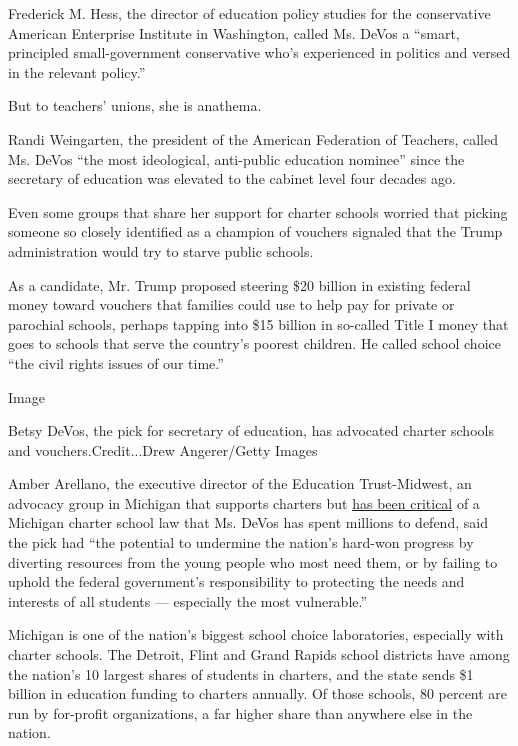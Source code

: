 Frederick M. Hess, the director of education policy studies for the
conservative American Enterprise Institute in Washington, called Ms.
DeVos a ``smart, principled small-government conservative who's
experienced in politics and versed in the relevant policy.''

But to teachers' unions, she is anathema.

Randi Weingarten, the president of the American Federation of Teachers,
called Ms. DeVos ``the most ideological, anti-public education nominee''
since the secretary of education was elevated to the cabinet level four
decades ago.

Even some groups that share her support for charter schools worried that
picking someone so closely identified as a champion of vouchers signaled
that the Trump administration would try to starve public schools.

As a candidate, Mr. Trump proposed steering \$20 billion in existing
federal money toward vouchers that families could use to help pay for
private or parochial schools, perhaps tapping into \$15 billion in
so-called Title I money that goes to schools that serve the country's
poorest children. He called school choice ``the civil rights issues of
our time.''

Image

Betsy DeVos, the pick for secretary of education, has advocated charter
schools and vouchers.Credit...Drew Angerer/Getty Images

Amber Arellano, the executive director of the Education Trust-Midwest,
an advocacy group in Michigan that supports charters but
\href{https://midwest.edtrust.org/accountability-for-all/}{has been
critical} of a Michigan charter school law that Ms. DeVos has spent
millions to defend, said the pick had ``the potential to undermine the
nation's hard-won progress by diverting resources from the young people
who most need them, or by failing to uphold the federal government's
responsibility to protecting the needs and interests of all students ---
especially the most vulnerable.''

Michigan is one of the nation's biggest school choice laboratories,
especially with charter schools. The Detroit, Flint and Grand Rapids
school districts have among the nation's 10 largest shares of students
in charters, and the state sends \$1 billion in education funding to
charters annually. Of those schools, 80 percent are run by for-profit
organizations, a far higher share than anywhere else in the nation.

